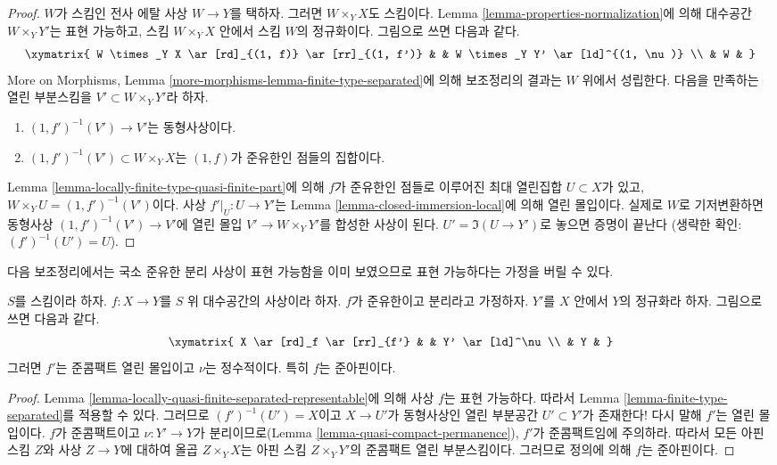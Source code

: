 \begin{proof}
$W$가 스킴인 전사 에탈 사상 $W \to Y$를 택하자. 그러면
$W \times_Y X$도 스킴이다. Lemma
\ref{lemma-properties-normalization}에 의해 대수공간
$W \times_Y Y'$는 표현 가능하고, 스킴 $W \times_Y X$ 안에서 스킴
$W$의 정규화이다. 그림으로 쓰면 다음과 같다.
$$
\xymatrix{
W \times_Y X \ar[rd]_{(1, f)} \ar[rr]_{(1, f')} & &
W \times_Y Y' \ar[ld]^{(1, \nu)} \\
& W &
}
$$
More on Morphisms, Lemma
\ref{more-morphisms-lemma-finite-type-separated}에 의해 보조정리의 결과는
$W$ 위에서 성립한다. 다음을 만족하는 열린 부분스킴을
$V' \subset W \times_Y Y'$라 하자.
\begin{enumerate}
\item $(1, f')^{-1}(V') \to V'$는 동형사상이다.
\item $(1, f')^{-1}(V') \subset W \times_Y X$는 $(1, f)$가 준유한인
점들의 집합이다.
\end{enumerate}
Lemma \ref{lemma-locally-finite-type-quasi-finite-part}에 의해 $f$가
준유한인 점들로 이루어진 최대 열린집합 $U \subset X$가 있고,
$W \times_Y U = (1, f')^{-1}(V')$이다. 사상
$f'|_U : U \to Y'$는 Lemma \ref{lemma-closed-immersion-local}에 의해
열린 몰입이다. 실제로 $W$로 기저변환하면 동형사상
$(1, f')^{-1}(V') \to V'$에 열린 몰입 $V' \to W \times_Y Y'$를 합성한
사상이 된다. $U' = \Im(U \to Y')$로 놓으면 증명이 끝난다
(생략한 확인: $(f')^{-1}(U') = U$).
\end{proof}

\noindent
다음 보조정리에서는 국소 준유한 분리 사상이 표현 가능함을 이미
보였으므로 표현 가능하다는 가정을 버릴 수 있다.

\begin{lemma}
\label{lemma-quasi-finite-separated-quasi-affine}
$S$를 스킴이라 하자. $f : X \to Y$를 $S$ 위 대수공간의 사상이라 하자.
$f$가 준유한이고 분리라고 가정하자. $Y'$를 $X$ 안에서 $Y$의 정규화라
하자. 그림으로 쓰면 다음과 같다.
$$
\xymatrix{
X \ar[rd]_f \ar[rr]_{f'} & & Y' \ar[ld]^\nu \\
& Y &
}
$$
그러면 $f'$는 준콤팩트 열린 몰입이고 $\nu$는 정수적이다. 특히 $f$는
준아핀이다.
\end{lemma}

\begin{proof}
Lemma \ref{lemma-locally-quasi-finite-separated-representable}에 의해 사상
$f$는 표현 가능하다. 따라서 Lemma
\ref{lemma-finite-type-separated}를 적용할 수 있다. 그러므로
$(f')^{-1}(U') = X$이고 $X \to U'$가 동형사상인 열린 부분공간
$U' \subset Y'$가 존재한다! 다시 말해 $f'$는 열린 몰입이다. $f$가
준콤팩트이고 $\nu : Y' \to Y$가 분리이므로(Lemma
\ref{lemma-quasi-compact-permanence}), $f'$가 준콤팩트임에 주의하라.
따라서 모든 아핀 스킴 $Z$와 사상 $Z \to Y$에 대하여 올곱
$Z \times_Y X$는 아핀 스킴 $Z \times_Y Y'$의 준콤팩트 열린
부분스킴이다. 그러므로 정의에 의해 $f$는 준아핀이다.
\end{proof}


